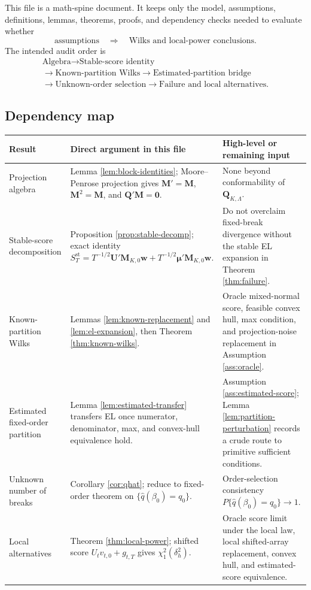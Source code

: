 \documentclass[12pt]{article}
\numberwithin{equation}{section}
\theoremstyle{definition}
\begin{document}
This file is a math-spine document. It keeps only the model, assumptions, definitions, lemmas, theorems, proofs, and dependency checks needed to evaluate whether
\[
    \text{assumptions}
    \quad\Longrightarrow\quad
    \text{Wilks and local-power conclusions}.
\]
The intended audit order is
\[
\begin{gathered}
\boxed{\text{Algebra}}
\rightarrow
\boxed{\text{Stable-score identity}}\\
\rightarrow
\boxed{\text{Known-partition Wilks}}
\rightarrow
\boxed{\text{Estimated-partition bridge}}\\
\rightarrow
\boxed{\text{Unknown-order selection}}
\rightarrow
\boxed{\text{Failure and local alternatives}}.
\end{gathered}
\]

\subsection*{Dependency map}

\begin{center}
\begin{tabular}{>{\raggedright\arraybackslash}p{}
                >{\raggedright\arraybackslash}p{}
                >{\raggedright\arraybackslash}p{}}
\hline
Result & Direct argument in this file & High-level or remaining input \\
\hline
Projection algebra & Lemma \ref{lem:block-identities}; Moore--Penrose projection gives \(\bm M'=\bm M\), \(\bm M^2=\bm M\), and \(\bm Q'\bm M=\bm0\). & None beyond conformability of \(\bm Q_{K,\Lambda}\). \\
Stable-score decomposition & Proposition \ref{prop:stable-decomp}; exact identity \(S_T^{\mathrm{st}}=T^{-1/2}\bm U'\bm M_{K,0}\bm w+T^{-1/2}\bm\mu'\bm M_{K,0}\bm w\). & Do not overclaim fixed-break divergence without the stable EL expansion in Theorem \ref{thm:failure}. \\
Known-partition Wilks & Lemmas \ref{lem:known-replacement} and \ref{lem:el-expansion}, then Theorem \ref{thm:known-wilks}. & Oracle mixed-normal score, feasible convex hull, max condition, and projection-noise replacement in Assumption \ref{ass:oracle}. \\
Estimated fixed-order partition & Lemma \ref{lem:estimated-transfer} transfers EL once numerator, denominator, max, and convex-hull equivalence hold. & Assumption \ref{ass:estimated-score}; Lemma \ref{lem:partition-perturbation} records a crude route to primitive sufficient conditions. \\
Unknown number of breaks & Corollary \ref{cor:qhat}; reduce to fixed-order theorem on \(\{\widehat q(\beta_0)=q_0\}\). & Order-selection consistency \(P\{\widehat q(\beta_0)=q_0\}\to1\). \\
Local alternatives & Theorem \ref{thm:local-power}; shifted score \(U_tv_{t,0}+g_{t,T}\) gives \(\chi_1^2(\delta_h^2)\). & Oracle score limit under the local law, local shifted-array replacement, convex hull, and estimated-score equivalence. \\
\hline
\end{tabular}
\end{center}
\end{document}
